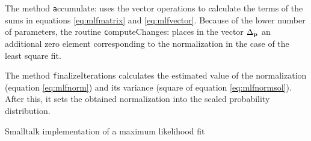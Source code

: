 The method {\texttt accumulate:} uses the vector operations to
calculate the terms of the sums in equations \ref{eq:mlfmatrix}
and \ref{eq:mlfvector}. Because of the lower number of parameters,
the routine {\texttt computeChanges:} places in the vector
$\Delta_{\textbf p}$ an additional zero element corresponding to the
normalization in the case of the least square fit.

The method {\texttt finalizeIterations} calculates the estimated value
of the normalization (equation \ref{eq:mlfnorm}) and its variance
(square of equation \ref{eq:mlfnormsol}). After this, it sets the
obtained normalization into the scaled probability distribution.

\begin{listing} Smalltalk implementation of a maximum likelihood fit \label{ls:mlf}

\end{listing}


